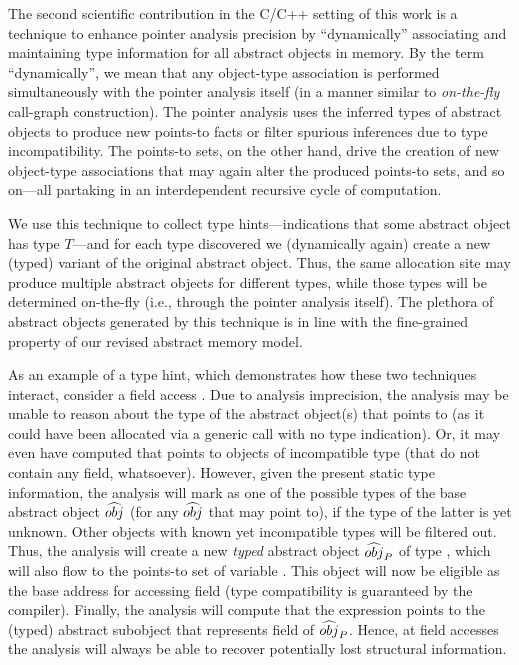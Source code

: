 The second scientific contribution in the C/C++ setting of this work
is a technique to enhance pointer analysis precision by
``dynamically'' associating and maintaining type information for all
abstract objects in memory.  By the term ``dynamically'', we mean that
any object-type association is performed simultaneously with the
pointer analysis itself (in a manner similar to \emph{on-the-fly}
call-graph construction). The pointer analysis uses the inferred types
of abstract objects to produce new points-to facts or filter spurious
inferences due to type incompatibility. The points-to sets, on the
other hand, drive the creation of new object-type associations that
may again alter the produced points-to sets, and so on---all partaking
in an interdependent recursive cycle of computation.

We use this technique to collect type hints---indications that some
abstract object has type \(T\)---and for each type discovered we
(dynamically again) create a new (typed) variant of the original
abstract object. Thus, the same allocation site may produce multiple
abstract objects for different types, while those types will be
determined on-the-fly (i.e., through the pointer analysis itself). The
plethora of abstract objects generated by this technique is in line
with the fine-grained property of our revised abstract memory model.

As an example of a type hint, which demonstrates how these two
techniques interact, consider a field access . Due
to analysis imprecision, the analysis may be unable to reason about
the type of the abstract object(s) that  points to (as it
could have been allocated via a generic  call with no
type indication). Or, it may even have computed that  points
to objects of incompatible type (that do not contain any 
field, whatsoever). However, given the present static type
information, the analysis will mark  as one of the possible
types of the base abstract object \(\widehat{obj}\) (for any
\(\widehat{obj}\) that  may point to), if the type of the latter
is yet unknown. Other objects with known yet incompatible types will
be filtered out. Thus, the analysis will create a new \emph{typed}
abstract object \(\widehat{obj}_P\) of type , which will also
flow to the points-to set of variable . This object will now
be eligible as the base address for accessing field  (type
compatibility is guaranteed by the compiler). Finally, the analysis
will compute that the expression  points to the (typed)
abstract subobject that represents field  of
\(\widehat{obj}_P\). Hence, at field accesses the analysis will always
be able to recover potentially lost structural information.

